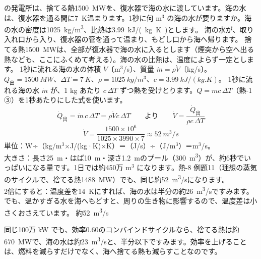\begin{phreidai}\label{ph:熱-0:ex3}
の発電所は、捨てる熱\qty{1500}{MW}を、復水器で海の水に渡しています。海の水は、復水器を通る間に\qty{7}{K}温まります。1秒に何 m$^3$ の海の水が要りますか。海の水の密度は\qty{1025}{kg/m^3}、比熱は\qty{3.99}{kJ/(kg.K)}とします。
\phbamen
海の水が、取り入れ口から入り、復水器の管を通って温まり、もどし口から海へ帰ります。
\phmushi
捨てる熱\qty{1500}{MW}は、全部が復水器で海の水に入るとします（煙突から空へ出る熱なども、ここにふくめて考える）。海の水の比熱は、温度によらず一定とします。
\phzu
1秒に流れる海の水の体積 $\dot V$〔m$^3$/s〕、質量 $\dot m=\rho\dot V$〔kg/s〕。$\dot Q_{\text{出}}=\qty{1500}{MW}$、$\Delta T=\qty{7}{K}$、$\rho=\qty{1025}{kg/m^3}$、$c=\qty{3.99}{kJ/(kg.K)}$。
\phriyu
1秒に流れる海の水 $\dot m$ が、1 kg あたり $c\,\Delta T$ ずつ熱を受けとります。$Q=mc\,\Delta T$（熱-1 ③）を1秒あたりにした式を使います。
\phtateru
\[\dot Q_{\text{出}}=\dot m\,c\,\Delta T=\rho\dot V c\,\Delta T\qquad\text{より}\qquad \dot V=\frac{\dot Q_{\text{出}}}{\rho c\,\Delta T}\]
\phtoku
\[\dot V=\frac{1500\times10^6}{1025\times3990\times7}\approx\qty{52}{m^3/s}\]
\phtashikame
単位：W÷（kg/m$^3$×J/(kg·K)×K）＝（J/s）÷（J/m$^3$）＝m$^3$/s。\\
大きさ：長さ\qty{25}{m}・はば\qty{10}{m}・深さ\qty{1.2}{m}のプール（\qty{300}{m^3}）が、約6秒でいっぱいになる量です。1日では約450万 m$^3$ になります。熱-8 例題11（理想の蒸気のサイクルで、捨てる熱\qty{1488}{MW}）でも、同じ約\qty{52}{m^3/s}になります。\\
2倍にすると：温度差を\qty{14}{K}にすれば、海の水は半分の約\qty{26}{m^3/s}ですみます。でも、温かすぎる水を海へもどすと、周りの生き物に影響するので、温度差は小さくおさえています。
\kotae 約\qty{52}{m^3/s}
\end{phreidai}
\noindent 同じ100万 kW でも、効率0.60のコンバインドサイクルなら、捨てる熱は約\qty{670}{MW}で、海の水は約\qty{23}{m^3/s}と、半分以下ですみます。効率を上げることは、燃料を減らすだけでなく、海へ捨てる熱も減らすことなのです。

